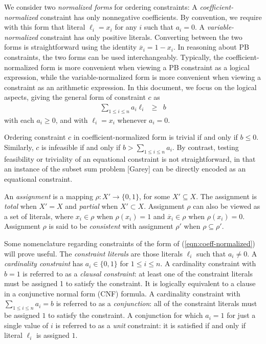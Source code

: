 \documentclass{easychair}
\renewcommand{\obar}[1]{\overline{#1}}
\newcommand{\lit}{\ell}
\newcommand{\assign}{\rho}
\begin{document}
We consider two {\em normalized forms} for ordering constraints: A
{\em coefficient-normalized} constraint has only nonnegative
coefficients.  By convention, we require with this form that literal $\lit_i = x_i$ for any $i$ such that $a_i = 0$.
A {\em variable-normalized} constraint has only
positive literals.  Converting between the two forms is
straightforward using the identity $\obar{x}_i = 1-x_i$.  In reasoning
about PB constraints, the two forms can be used interchangeably.
Typically, the coefficient-normalized form is more convenient when
viewing a PB constraint as a logical expression, while the
variable-normalized form is more convenient when viewing a constraint
as an arithmetic expression.  In this document, we focus on the logical
aspects, giving the general form of constraint $c$ as
\begin{eqnarray}
\sum_{1 \leq i \leq n} a_{i} \lit_{i} & \geq & b \label{eqn:coeff-normalized}
\end{eqnarray}
with each $a_{i} \geq 0$, and with $\lit_{i} = x_i$ whenever $a_i = 0$.

Ordering constraint $c$ in coefficient-normalized form is trivial if and only
if $b \leq 0$.  Similarly, $c$ is infeasible if and only if
$b > \sum_{1 \leq i \leq n} {a_{i}}$.  By contrast, testing feasibility or triviality
of an equational constraint is not straightforward, in that an instance of the
subset sum problem [Garey] can be directly encoded as an equational
constraint.

An {\em assignment} is a mapping $\assign : X' \rightarrow \{0,1\}$,
for some $X' \subseteq X$.  The assignment is {\em total} when
$X' = X$ and {\em partial} when $X' \subset X$.  Assignment $\assign$ can
also be viewed as a set of literals, where $x_i \in \assign$ when
$\assign(x_i) = 1$ and $\obar{x}_i \in \assign$ when $\assign(x_i) = 0$.
Assignment $\assign$ is said to be \emph{consistent} with assignment $\assign'$ when $\assign \subseteq \assign'$.


Some nomenclature regarding constraints of the form of
(\ref{eqn:coeff-normalized}) will prove useful.  The {\em constraint
  literals} are those literals $\lit_i$ such that $a_i \not = 0$.  A
{\em cardinality constraint} has $a_i \in \{0,1\}$ for $1 \leq i \leq
n$.  A cardinality constraint with $b=1$ is referred to as a {\em
  clausal constraint}: at least one of the constraint literals must be assigned 1
to satisfy the constraint.  It is logically equivalent to a clause in a conjunctive normal form (CNF) formula.
A cardinality constraint with $\sum_{1\leq
  i\leq n} a_i = b$ is referred to as a {\em conjunction}: all of the
constraint literals must be assigned $1$ to satisfy the constraint.
A
conjunction for which $a_i = 1$ for just a single value of $i$ is
referred to as a {\em unit} constraint: it is satisfied if and only if
literal $\lit_i$ is assigned $1$.
\end{document}
